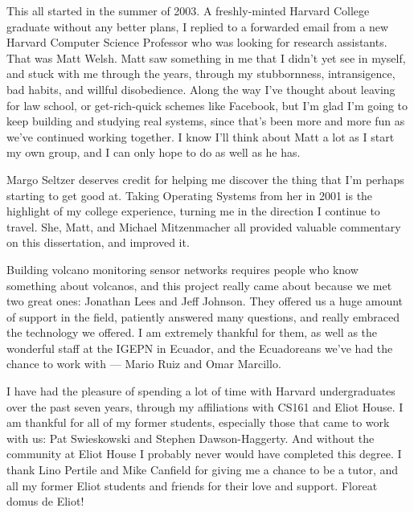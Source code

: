 This all started in the summer of 2003. A freshly-minted Harvard College
graduate without any better plans, I replied to a forwarded email from a new
Harvard Computer Science Professor who was looking for research assistants.
That was Matt Welsh. Matt saw something in me that I didn't yet see in
myself, and stuck with me through the years, through my stubbornness,
intransigence, bad habits, and willful disobedience. Along the way I've
thought about leaving for law school, or get-rich-quick schemes like
Facebook, but I'm glad I'm going to keep building and studying real systems,
since that's been more and more fun as we've continued working together. I
know I'll think about Matt a lot as I start my own group, and I can only hope
to do as well as he has.

Margo Seltzer deserves credit for helping me discover the thing that I'm
perhaps starting to get good at. Taking Operating Systems from her in 2001 is
the highlight of my college experience, turning me in the direction I
continue to travel. She, Matt, and Michael Mitzenmacher all provided valuable
commentary on this dissertation, and improved it.

Building volcano monitoring sensor networks requires people who know
something about volcanos, and this project really came about because we met
two great ones: Jonathan Lees and Jeff Johnson. They offered us a huge amount
of support in the field, patiently answered many questions, and really
embraced the technology we offered. I am extremely thankful for them, as well
as the wonderful staff at the IGEPN in Ecuador, and the Ecuadoreans we've had
the chance to work with --- Mario Ruiz and Omar Marcillo.

I have had the pleasure of spending a lot of time with Harvard undergraduates
over the past seven years, through my affiliations with CS161 and Eliot
House. I am thankful for all of my former students, especially those that
came to work with us: Pat Swieskowski and Stephen Dawson-Haggerty. And
without the community at Eliot House I probably never would have completed
this degree. I thank Lino Pertile and Mike Canfield for giving me a chance to
be a tutor, and all my former Eliot students and friends for their love and
support. Floreat domus de Eliot!

